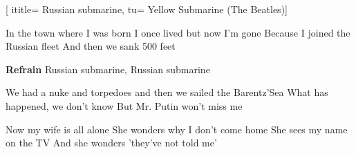  [
ititle= {Russian submarine},
tu= {Yellow Submarine (The Beatles)}]

\beginverse
In the town where I was born
I once lived but now I'm gone
Because I joined the Russian fleet
And then we sank 500 feet
\endverse

\beginchorus
\textbf {Refrain}
 {Russian submarine, Russian submarine}
\endchorus

\beginverse
We had a nuke and torpedoes
and then we sailed the Barentz'Sea
What has happened, we don't know
But Mr. Putin won't miss me
\endverse

\beginverse
Now my wife is all alone
She wonders why I don't come home
She sees my name on the TV
And she wonders 'they've not told me'
\endverse

\endsong